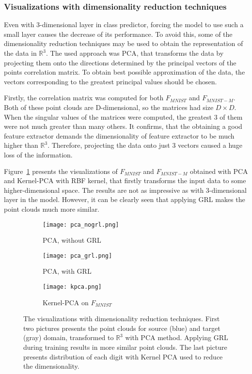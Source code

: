 \documentclass{article}
\begin{document}
\subsubsection{Visualizations with dimensionality reduction techniques}
Even with 3-dimensional layer in class predictor, forcing the model to use such a small layer causes the decrease of its performance. To avoid this, some of the dimensionality reduction techniques may be used to obtain the representation of the data in $\mathbb{R}^{3}$. The used approach was PCA, that transforms the data by projecting them onto the directions determined by the principal vectors of the points correlation matrix. To obtain best possible approximation of the data, the vectors corresponding to the greatest principal values should be chosen. 
\par
Firstly, the correlation matrix was computed for both $F_{MNIST}$ and $F_{MNIST-M}$. Both of these point clouds are D-dimensional, so the matrices had size $D\times D$. When the singular values of the matrices were computed, the greatest 3 of them were not much greater than many others. It confirms, that the obtaining a good feature extractor demands the dimensionality of feature extractor to be much higher than $\mathbb{R}^{3}$. Therefore, projecting the data onto just 3 vectors caused a huge loss of the information. 
\par
Figure~\ref{fig:dim_red} presents the visualizations of $F_{MNIST}$ and $F_{MNIST-M}$ obtained with PCA and Kernel-PCA with RBF kernel, that firstly transforms the input data to some higher-dimensional space. The results are not as impressive as with 3-dimensional layer in the model. However, it can be clearly seen that applying GRL makes the point clouds much more similar. 

\begin{figure}[H]%
    \centering
    
    \begin{subfigure}[b]{0.33\textwidth}
        \texttt{[image: pca\_nogrl.png]}
        \caption{PCA, without GRL}
    \end{subfigure}%
    \begin{subfigure}[b]{0.33\textwidth}
        \texttt{[image: pca\_grl.png]}
        \caption{PCA, with GRL}
    \end{subfigure}%
    \begin{subfigure}[b]{0.33\textwidth}
        \texttt{[image: kpca.png]}
        \caption{Kernel-PCA on $F_{MNIST}$}
    \end{subfigure}%
    \caption{The visualizations with dimensionality reduction techniques. First two pictures presents the point clouds for source (blue) and target (gray) domain, transformed to $\mathbb{R}^{3}$ with PCA method. Applying GRL during training results in more similar point clouds. The last picture presents distribution of each digit with Kernel PCA used to reduce the dimensionality.}%
    \label{fig:dim_red}%
\end{figure}
\end{document}
